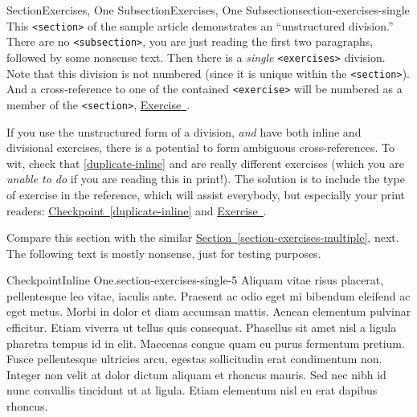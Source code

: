 \documentclass[twoside,10pt,]{article}
\newcommand{\xreffont}{\relax}
\newcommand{\mono}[1]{\texttt{#1}}
\numberwithin{equation}{section}
\begin{document}
%
%
\typeout{************************************************}
\typeout{************************************************}
%
\begin{sectionptx}{Section}{Exercises, One Subsection}{}{Exercises, One Subsection}{}{}{section-exercises-single}
This \mono{<section>} of the sample article demonstrates an ``unstructured division.''  There are no \mono{<subsection>}, you are just reading the first two paragraphs, followed by some nonsense text.  Then there is a \emph{single} \mono{<exercises>} division.  Note that this division is not numbered (since it is unique within the \mono{<section>}).  And a cross-reference to one of the contained \mono{<exercise>} will be numbered as a member of the \mono{<section>}, \hyperlink{exercise-challenging-one-unstructured}{Exercise~{\xreffont 37.4}}.%
\par
If you use the unstructured form of a division, \emph{and} have both inline and divisional exercises, there is a potential to form ambiguous cross-references.  To wit, check that \hyperref[duplicate-inline]{{\xreffont\ref{duplicate-inline}}} and \hyperlink{duplicate-divisional}{{\xreffont 37.2}} are really different exercises (which you are \emph{unable to do} if you are reading this in print!).  The solution is to include the type of exercise in the reference, which will assist everybody, but especially your print readers:  \hyperref[duplicate-inline]{Checkpoint~{\xreffont\ref{duplicate-inline}}} and \hyperlink{duplicate-divisional}{Exercise~{\xreffont 37.2}}.%
\par
Compare this section with the similar \hyperref[section-exercises-multiple]{Section~{\xreffont\ref{section-exercises-multiple}}}, next.  The following text is mostly nonsense, just for testing purposes.%
\begin{inlineexercise}{Checkpoint}{Inline One.}{section-exercises-single-5}%
Aliquam vitae risus placerat, pellentesque leo vitae, iaculis ante. Praesent ac odio eget mi bibendum eleifend ac eget metus. Morbi in dolor et diam accumsan mattis. Aenean elementum pulvinar efficitur. Etiam viverra ut tellus quis consequat. Phasellus sit amet nisl a ligula pharetra tempus id in elit. Maecenas congue quam eu purus fermentum pretium. Fusce pellentesque ultricies arcu, egestas sollicitudin erat condimentum non. Integer non velit at dolor dictum aliquam et rhoncus mauris. Sed nec nibh id nunc convallis tincidunt ut at ligula. Etiam elementum nisl eu erat dapibus rhoncus.%
\end{inlineexercise}%

\end{sectionptx}
\end{document}
